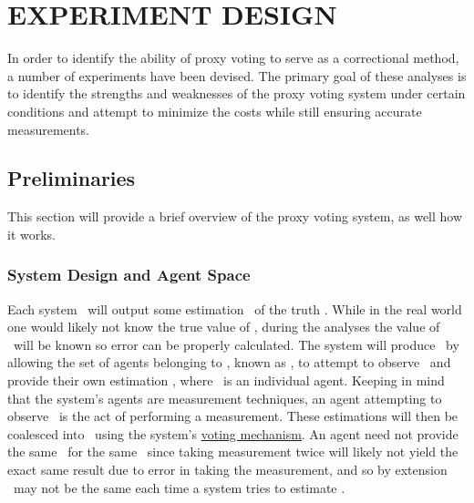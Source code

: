 %
%

\chapter{EXPERIMENT DESIGN}\label{ch:experiment-design}
In order to identify the ability of proxy voting to serve as a correctional
method, a number of experiments have been devised.
The primary goal of these analyses is to identify the strengths and
weaknesses of the proxy voting system under certain conditions and attempt to minimize
the costs while still ensuring accurate measurements.


\section{Preliminaries}\label{sec:preliminaries}
This section will provide a brief overview of the proxy voting system, as well how it
works.


\subsection{System Design and Agent Space}
\label{subsec:system-design-and-agent-space}
Each system \system\ will output some estimation \systemtruth\ of the truth
\truth.
While in the real world one would likely not know the true value of \truth, during the
analyses the value of \truth\ will be known so error can be properly calculated. 
The system will produce \systemtruth\ by allowing the set of agents belonging to
\system, known as \systemagents, to attempt to observe \truth\ and provide their own
estimation \agenttruth, where \agent\ is an individual agent.
Keeping in mind that the system's agents are measurement techniques, an agent
attempting to observe \truth\ is the act of performing a measurement.
These estimations will then be coalesced into \systemtruth\ using
the system's \hyperref[subsec:voting-mechanisms]{voting mechanism}.
An agent need not provide the same \agenttruth\ for the same \truth\ since taking
measurement twice will likely not yield the exact same result due to error in taking
the measurement, and so by extension \systemtruth\ may not be the same each time a
system tries to estimate \truth.

